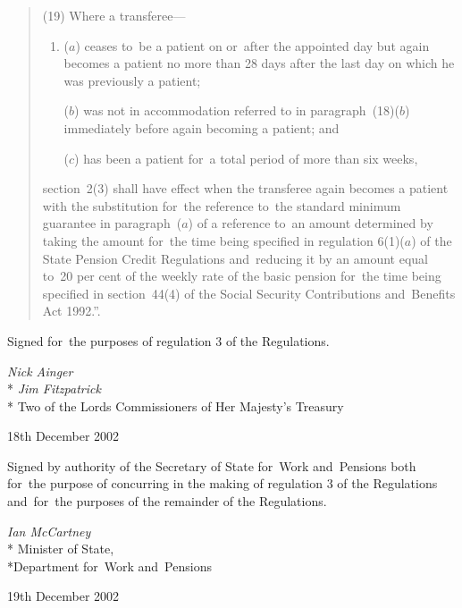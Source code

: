\documentclass[12pt,a4paper]{article}
\begin{document}
\begin{enumerate}
\begin{quotation}
(19) Where a transferee—
\begin{enumerate}\item[]
($a$) ceases to~be a patient on or~after the appointed day but again becomes a patient no more than 28 days after the last day on which he was previously a patient;

\begin{sloppypar}
($b$) was not in accommodation referred to in paragraph~(18)($b$)  immediately before again becoming a patient; and
\end{sloppypar}

($c$) has been a patient for~a total period of more than six weeks,
\end{enumerate}
section~2(3) shall have effect when the transferee again becomes a patient with the substitution for~the reference to~the standard minimum guarantee in paragraph~($a$)  of a reference to~an amount determined by taking the amount for~the time being specified in regulation 6(1)($a$)  of the State Pension Credit Regulations and~reducing it by an amount equal to~20 per cent of the weekly rate of the basic pension for~the time being specified in section~44(4) of the Social Security Contributions and~Benefits Act 1992.”.
\end{quotation}
\end{enumerate}

\bigskip

Signed for~the purposes of regulation 3 of the Regulations. 

{\raggedleft
\emph{Nick Ainger}\\*
\emph{Jim Fitzpatrick}\\*
Two of the Lords Commissioners of Her Majesty's Treasury

}

18th December 2002

\bigskip

Signed 
by authority of the 
Secretary of State for~Work and~Pensions
both for~the purpose of concurring in the making of regulation 3 of the Regulations and~for~the purposes of the remainder of the Regulations. 

{\raggedleft
\emph{Ian McCartney}\\*
Minister
of State,\\*Department 
for~Work and~Pensions

}

19th December 2002
\end{document}
